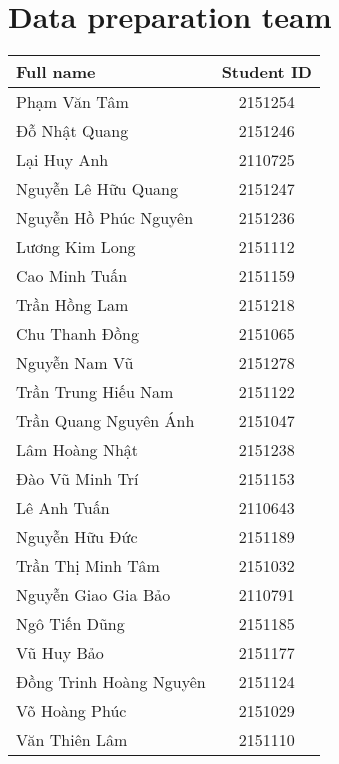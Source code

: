 \chapter{Data preparation team}
\begin{table}[ht]
    \centering
    \begin{tabular}{|l|c|}
        \hline
         \textbf{Full name} & \textbf{Student ID} \\
         \hline
         Phạm Văn Tâm & 2151254\\
         \hline
         Đỗ Nhật Quang & 2151246 \\
         \hline
         Lại Huy Anh & 2110725\\
         \hline
         Nguyễn Lê Hữu Quang & 2151247 \\
         \hline
         Nguyễn Hồ Phúc Nguyên & 2151236 \\
         \hline
         Lương Kim Long & 2151112 \\
         \hline
         Cao Minh Tuấn & 2151159 \\
         \hline
         Trần Hồng Lam & 2151218\\
         \hline
         Chu Thanh Đồng & 2151065 \\
         \hline
         Nguyễn Nam Vũ & 2151278 \\
         \hline
         Trần Trung Hiếu Nam & 2151122 \\
         \hline
         Trần Quang Nguyên Ánh & 2151047 \\
         \hline
         Lâm Hoàng Nhật & 2151238 \\
         \hline
         Đào Vũ Minh Trí & 2151153 \\
         \hline
         Lê Anh Tuấn & 2110643 \\
         \hline
         Nguyễn Hữu Đức & 2151189 \\
         \hline
         Trần Thị Minh Tâm & 2151032 \\
         \hline
         Nguyễn Giao Gia Bảo & 2110791 \\
         \hline
         Ngô Tiến Dũng & 2151185 \\
         \hline
         Vũ Huy Bảo & 2151177 \\
         \hline
         Đồng Trinh Hoàng Nguyên & 2151124 \\
         \hline
         Võ Hoàng Phúc & 2151029 \\
         \hline
         Văn Thiên Lâm & 2151110 \\
         \hline

\end{tabular}
\end{table}
